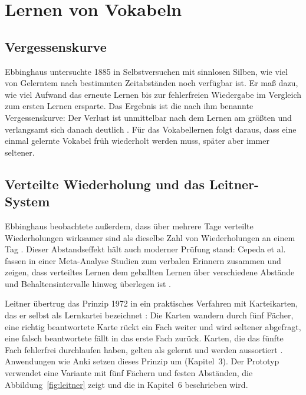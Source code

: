 \documentclass[12pt,a4paper]{scrreprt}
\begin{document}
\section{Lernen von Vokabeln}

\subsection{Vergessenskurve}
Ebbinghaus untersuchte 1885 in Selbstversuchen mit sinnlosen Silben, wie viel von Gelerntem nach bestimmten Zeitabständen noch verfügbar ist. Er maß dazu, wie viel Aufwand das erneute Lernen bis zur fehlerfreien Wiedergabe im Vergleich zum ersten Lernen ersparte. Das Ergebnis ist die nach ihm benannte Vergessenskurve: Der Verlust ist unmittelbar nach dem Lernen am größten und verlangsamt sich danach deutlich \cite{ebbinghaus1885}. Für das Vokabellernen folgt daraus, dass eine einmal gelernte Vokabel früh wiederholt werden muss, später aber immer seltener.

\subsection{Verteilte Wiederholung und das Leitner-System}
Ebbinghaus beobachtete außerdem, dass über mehrere Tage verteilte Wiederholungen wirksamer sind als dieselbe Zahl von Wiederholungen an einem Tag \cite{ebbinghaus1885}. Dieser Abstandseffekt hält auch moderner Prüfung stand: Cepeda et al. fassen in einer Meta-Analyse Studien zum verbalen Erinnern zusammen und zeigen, dass verteiltes Lernen dem geballten Lernen über verschiedene Abstände und Behaltensintervalle hinweg überlegen ist \cite{cepeda2006}.

Leitner übertrug das Prinzip 1972 in ein praktisches Verfahren mit Karteikarten, das er selbst als \glqq Lernkartei\grqq{} bezeichnet \cite[S.~64]{leitner1972}: Die Karten wandern durch fünf Fächer, eine richtig beantwortete Karte rückt ein Fach weiter und wird seltener abgefragt, eine falsch beantwortete fällt in das erste Fach zurück. Karten, die das fünfte Fach fehlerfrei durchlaufen haben, gelten als gelernt und werden aussortiert \cite[S.~71]{leitner1972}. Anwendungen wie Anki setzen dieses Prinzip um (Kapitel~3). Der Prototyp verwendet eine Variante mit fünf Fächern und festen Abständen, die Abbildung~\ref{fig:leitner} zeigt und die in Kapitel~6 beschrieben wird.
\end{document}
